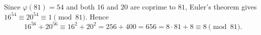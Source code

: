 Since $\varphi(81)=54$ and both $16$ and $20$ are coprime to $81$, Euler's theorem gives $16^{54}\equiv20^{54}\equiv1\pmod{81}$. Hence
\[
16^{56}+20^{56}\equiv16^2+20^2=256+400=656=8\cdot81+8\equiv\boxed{8}\pmod{81}.
\]
